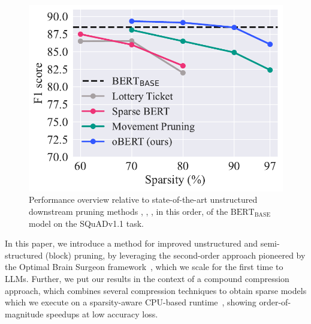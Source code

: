 \documentclass[11pt]{article}
\newcommand{\bert}{$\textrm{BERT}_{\textrm{BASE}}\,$}
\begin{document}
 \begin{figure}[t]
    \centering
    \includegraphics[scale=0.5]{media/overview_squad_F1.pdf}
    \vspace{-0.1in}
    \caption{Performance overview relative to state-of-the-art unstructured downstream pruning methods \citet{chen2020lottery}, \citet{Xu2021RethinkingNP}, \citet{Sanh2020MovementPA}, in this order, of the \bert model on the SQuADv1.1 task.}
    \label{fig:squad_F1}
    \vspace{-0.3in}
\end{figure}

In this paper, we introduce a method for improved unstructured and semi-structured (block) pruning, by leveraging the second-order approach pioneered by the Optimal Brain Surgeon framework~\cite{LeCun1989OptimalBD, hassibi1993second}, which we scale for the first time to LLMs. Further, we put our results in the context of a compound compression approach, which combines several compression techniques to obtain sparse models which we execute on a sparsity-aware CPU-based runtime~\cite{deepsparse}, showing order-of-magnitude speedups at low accuracy loss.
\end{document}
